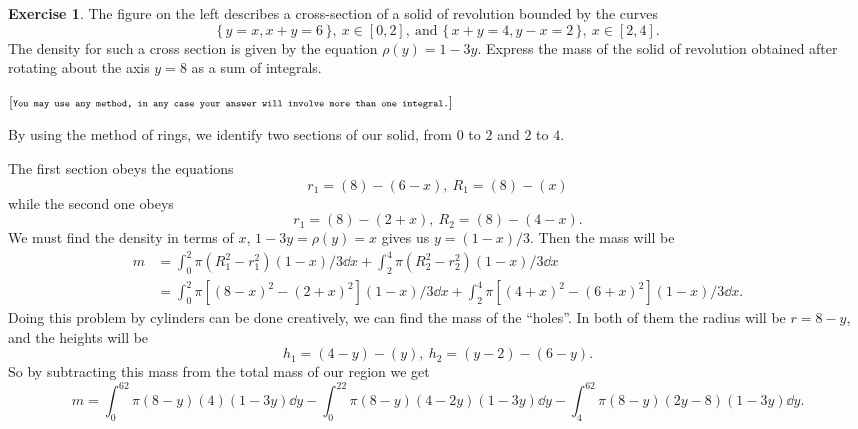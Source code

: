 \documentclass[12pt]{article}
\theoremstyle{plain}
\theoremstyle{definition}
\newtheorem{Ej}[Th]{Exercise}         %
\theoremstyle{remark}
\renewcommand{\:}{\colon}           %
\renewcommand{\.}{\Cdot}                %
\newcommand{\set}[1]{\{\,#1\,\}}    %
\begin{document}
\begin{center}

\end{center}
\begin{Ej}
 The figure on the left describes a cross-section of a solid of revolution bounded by the curves 
 $$\set{y=x,x+y=6},\ x\in[0,2],\ \text{and }\set{x+y=4,y-x=2},\ x\in[2,4].$$
 The density for such a cross section is given by the equation $\rho(y)=1-3y$. Express the mass of the solid of revolution obtained after rotating about the axis $y=8$ as a sum of integrals.\par $\lbrack \scriptsize\texttt{You may use any method, in any case your answer will involve more than one integral.}\rbrack$
\end{Ej}
\begin{ptcb}
 By using the method of rings, we identify two sections of our solid, from $0$ to $2$ and $2$ to $4$.\par 
 The first section obeys the equations 
 $$r_1=(8)-(6-x),\ R_1=(8)-(x)$$
 while the second one obeys
 $$r_1=(8)-(2+x),\ R_2=(8)-(4-x).$$
 We must find the density in terms of $x$, $1-3y=\rho(y)=x$ gives us $y=(1-x)/3$. Then the mass will be 
 \begin{align*}
  m&=\int_0^2\pi(R_1^2-r_1^2)(1-x)/3\dd x+\int_2^4\pi(R_2^2-r_2^2)(1-x)/3\dd x\\
  &=\int_0^2\pi[(8-x)^2-(2+x)^2](1-x)/3\dd x+\int_2^4\pi[(4+x)^2-(6+x)^2](1-x)/3\dd x.
 \end{align*}
 Doing this problem by cylinders can be done creatively, we can find the mass of the ``holes''. In both of them the radius will be $r=8-y$, and the heights will be 
 $$h_1=(4-y)-(y),\ h_2=(y-2)-(6-y).$$
 So by subtracting this mass from the total mass of our region we get 
 $$m=\int_{0}^62\pi(8-y)(4)(1-3y)\dd y-\int_0^22\pi(8-y)(4-2y)(1-3y)\dd y-\int_4^62\pi(8-y)(2y-8)(1-3y)\dd y.$$
\end{ptcb}
\end{document}
